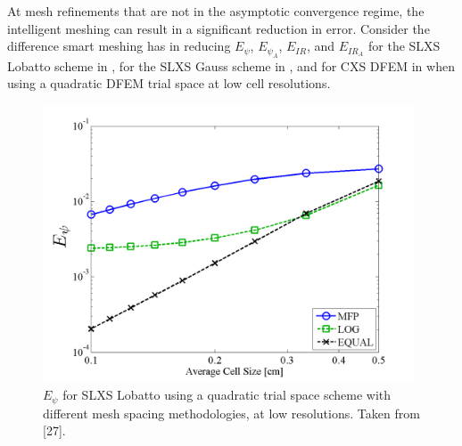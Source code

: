 At mesh refinements that are not in the asymptotic convergence regime, the intelligent meshing can result in a significant reduction in error.  
Consider the difference smart meshing has in reducing $E_{\psi}$, $E_{\psi_A}$, $E_{IR}$, and $E_{IR_A}$ for the SLXS Lobatto scheme in
, for the SLXS Gauss scheme in , 
and for CXS DFEM in  when using a quadratic DFEM trial space at low cell resolutions.
\begin{figure}[!hbp]
\centering
\includegraphics[width=11cm]{chapter3_variable_xs/LOW_RES_P2_LOBATTO_E_PSI.png}
\caption{$E_{\psi}$ for SLXS Lobatto using a quadratic trial space scheme with different mesh spacing methodologies, at low resolutions.  Taken from [27].}
\label{fig:low_res_lobatto_psi}
\end{figure}
\vfill{}
\pagebreak

